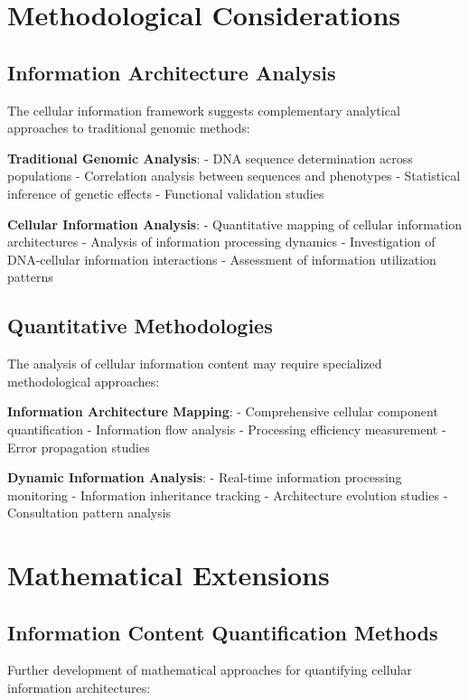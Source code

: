 \documentclass[12pt,a4paper]{article}
\begin{document}
\section{Methodological Considerations}

\subsection{Information Architecture Analysis}

The cellular information framework suggests complementary analytical approaches to traditional genomic methods:

\textbf{Traditional Genomic Analysis}:
- DNA sequence determination across populations
- Correlation analysis between sequences and phenotypes  
- Statistical inference of genetic effects
- Functional validation studies

\textbf{Cellular Information Analysis}:
- Quantitative mapping of cellular information architectures
- Analysis of information processing dynamics
- Investigation of DNA-cellular information interactions
- Assessment of information utilization patterns

\subsection{Quantitative Methodologies}

The analysis of cellular information content may require specialized methodological approaches:

\textbf{Information Architecture Mapping}:
- Comprehensive cellular component quantification
- Information flow analysis
- Processing efficiency measurement
- Error propagation studies

\textbf{Dynamic Information Analysis}:
- Real-time information processing monitoring
- Information inheritance tracking
- Architecture evolution studies
- Consultation pattern analysis

\section{Mathematical Extensions}

\subsection{Information Content Quantification Methods}

Further development of mathematical approaches for quantifying cellular information architectures:
\end{document}
